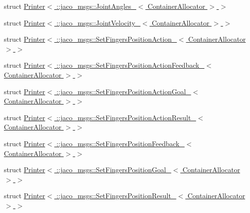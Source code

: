 \begin{DoxyCompactItemize}
\item 
struct \hyperlink{structros_1_1message__operations_1_1Printer_3_01_1_1jaco__msgs_1_1JointAngles___3_01ContainerAllocator_01_4_01_4}{Printer$<$ \+::jaco\+\_\+msgs\+::\+Joint\+Angles\+\_\+$<$ Container\+Allocator $>$ $>$}
\item 
struct \hyperlink{structros_1_1message__operations_1_1Printer_3_01_1_1jaco__msgs_1_1JointVelocity___3_01ContainerAllocator_01_4_01_4}{Printer$<$ \+::jaco\+\_\+msgs\+::\+Joint\+Velocity\+\_\+$<$ Container\+Allocator $>$ $>$}
\item 
struct \hyperlink{structros_1_1message__operations_1_1Printer_3_01_1_1jaco__msgs_1_1SetFingersPositionAction___3_01ContainerAllocator_01_4_01_4}{Printer$<$ \+::jaco\+\_\+msgs\+::\+Set\+Fingers\+Position\+Action\+\_\+$<$ Container\+Allocator $>$ $>$}
\item 
struct \hyperlink{structros_1_1message__operations_1_1Printer_3_01_1_1jaco__msgs_1_1SetFingersPositionActionFeedbae13e05216e53f9116f074ec65036b29d}{Printer$<$ \+::jaco\+\_\+msgs\+::\+Set\+Fingers\+Position\+Action\+Feedback\+\_\+$<$ Container\+Allocator $>$ $>$}
\item 
struct \hyperlink{structros_1_1message__operations_1_1Printer_3_01_1_1jaco__msgs_1_1SetFingersPositionActionGoal__33ea544897d72e7b50aaaf79efc6fd71}{Printer$<$ \+::jaco\+\_\+msgs\+::\+Set\+Fingers\+Position\+Action\+Goal\+\_\+$<$ Container\+Allocator $>$ $>$}
\item 
struct \hyperlink{structros_1_1message__operations_1_1Printer_3_01_1_1jaco__msgs_1_1SetFingersPositionActionResult044e352a34a7e800d3ed4a693b89337f}{Printer$<$ \+::jaco\+\_\+msgs\+::\+Set\+Fingers\+Position\+Action\+Result\+\_\+$<$ Container\+Allocator $>$ $>$}
\item 
struct \hyperlink{structros_1_1message__operations_1_1Printer_3_01_1_1jaco__msgs_1_1SetFingersPositionFeedback___3_01ContainerAllocator_01_4_01_4}{Printer$<$ \+::jaco\+\_\+msgs\+::\+Set\+Fingers\+Position\+Feedback\+\_\+$<$ Container\+Allocator $>$ $>$}
\item 
struct \hyperlink{structros_1_1message__operations_1_1Printer_3_01_1_1jaco__msgs_1_1SetFingersPositionGoal___3_01ContainerAllocator_01_4_01_4}{Printer$<$ \+::jaco\+\_\+msgs\+::\+Set\+Fingers\+Position\+Goal\+\_\+$<$ Container\+Allocator $>$ $>$}
\item 
struct \hyperlink{structros_1_1message__operations_1_1Printer_3_01_1_1jaco__msgs_1_1SetFingersPositionResult___3_01ContainerAllocator_01_4_01_4}{Printer$<$ \+::jaco\+\_\+msgs\+::\+Set\+Fingers\+Position\+Result\+\_\+$<$ Container\+Allocator $>$ $>$}

\end{DoxyCompactItemize}
